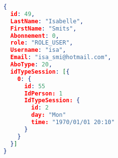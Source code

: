 \begin{lstlisting}[language=json,firstnumber=1]
{
  id: 49,
  LastName: "Isabelle",
  FirstName: "Smits",
  Abonnement: 0,
  role: "ROLE_USER",
  Username: "isa",
  Email: "isa_smi@hotmail.com",
  AboType: 20,
  idTypeSession: [{
  	0: {
	  id: 55
	  IdPerson: 1
	  IdTypeSession: {
	    id: 2
		day: "Mon"
		time: "1970/01/01 20:10"
	  }
    }
  }]
}
\end{lstlisting}